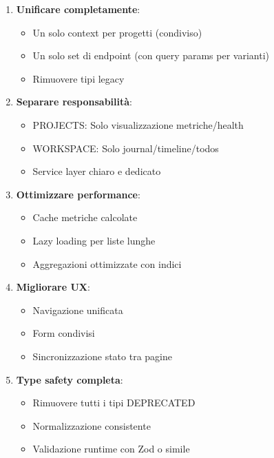 \documentclass[11pt,a4paper]{article}
\begin{document}
\begin{enumerate}
    \item \textbf{Unificare completamente}:
    \begin{itemize}
        \item Un solo context per progetti (condiviso)
        \item Un solo set di endpoint (con query params per varianti)
        \item Rimuovere tipi legacy
    \end{itemize}
    
    \item \textbf{Separare responsabilità}:
    \begin{itemize}
        \item PROJECTS: Solo visualizzazione metriche/health
        \item WORKSPACE: Solo journal/timeline/todos
        \item Service layer chiaro e dedicato
    \end{itemize}
    
    \item \textbf{Ottimizzare performance}:
    \begin{itemize}
        \item Cache metriche calcolate
        \item Lazy loading per liste lunghe
        \item Aggregazioni ottimizzate con indici
    \end{itemize}
    
    \item \textbf{Migliorare UX}:
    \begin{itemize}
        \item Navigazione unificata
        \item Form condivisi
        \item Sincronizzazione stato tra pagine
    \end{itemize}
    
    \item \textbf{Type safety completa}:
    \begin{itemize}
        \item Rimuovere tutti i tipi DEPRECATED
        \item Normalizzazione consistente
        \item Validazione runtime con Zod o simile
    \end{itemize}
\end{enumerate}
\end{document}
